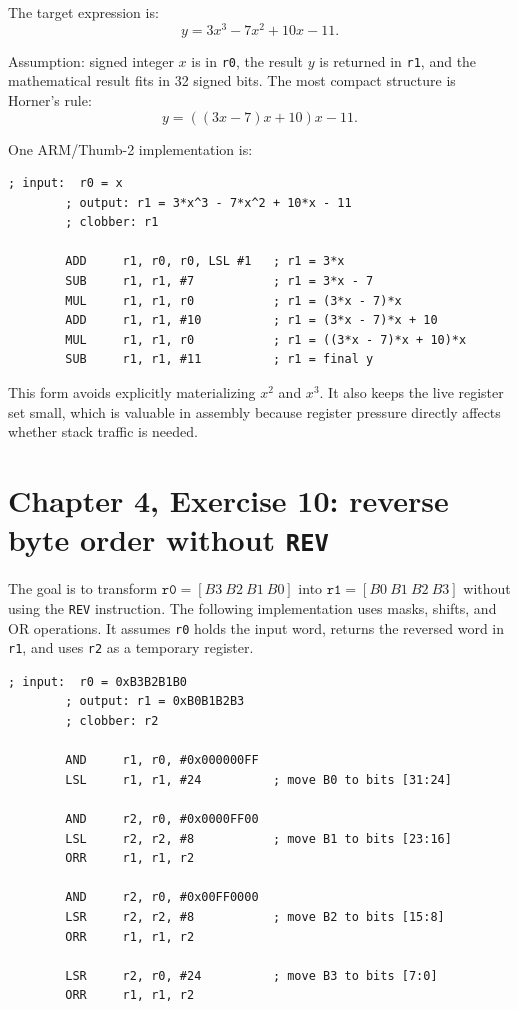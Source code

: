 \documentclass[11pt]{article}
\newcommand{\code}[1]{\texttt{#1}}
\begin{document}
The target expression is:
\[
y = 3x^3 - 7x^2 + 10x - 11.
\]

Assumption: signed integer \(x\) is in \code{r0}, the result \(y\) is returned in \code{r1}, and the mathematical result fits in 32 signed bits. The most compact structure is Horner's rule:
\[
y = ((3x - 7)x + 10)x - 11.
\]

One ARM/Thumb-2 implementation is:

\begin{Verbatim}[fontsize=\small]
        ; input:  r0 = x
        ; output: r1 = 3*x^3 - 7*x^2 + 10*x - 11
        ; clobber: r1

        ADD     r1, r0, r0, LSL #1   ; r1 = 3*x
        SUB     r1, r1, #7           ; r1 = 3*x - 7
        MUL     r1, r1, r0           ; r1 = (3*x - 7)*x
        ADD     r1, r1, #10          ; r1 = (3*x - 7)*x + 10
        MUL     r1, r1, r0           ; r1 = ((3*x - 7)*x + 10)*x
        SUB     r1, r1, #11          ; r1 = final y
\end{Verbatim}

This form avoids explicitly materializing \(x^2\) and \(x^3\). It also keeps the live register set small, which is valuable in assembly because register pressure directly affects whether stack traffic is needed.

\section*{Chapter 4, Exercise 10: reverse byte order without \code{REV}}

The goal is to transform \(\code{r0} = [B3\ B2\ B1\ B0]\) into \(\code{r1} = [B0\ B1\ B2\ B3]\) without using the \code{REV} instruction. The following implementation uses masks, shifts, and OR operations. It assumes \code{r0} holds the input word, returns the reversed word in \code{r1}, and uses \code{r2} as a temporary register.

\begin{Verbatim}[fontsize=\small]
        ; input:  r0 = 0xB3B2B1B0
        ; output: r1 = 0xB0B1B2B3
        ; clobber: r2

        AND     r1, r0, #0x000000FF
        LSL     r1, r1, #24          ; move B0 to bits [31:24]

        AND     r2, r0, #0x0000FF00
        LSL     r2, r2, #8           ; move B1 to bits [23:16]
        ORR     r1, r1, r2

        AND     r2, r0, #0x00FF0000
        LSR     r2, r2, #8           ; move B2 to bits [15:8]
        ORR     r1, r1, r2

        LSR     r2, r0, #24          ; move B3 to bits [7:0]
        ORR     r1, r1, r2
\end{Verbatim}
\end{document}
